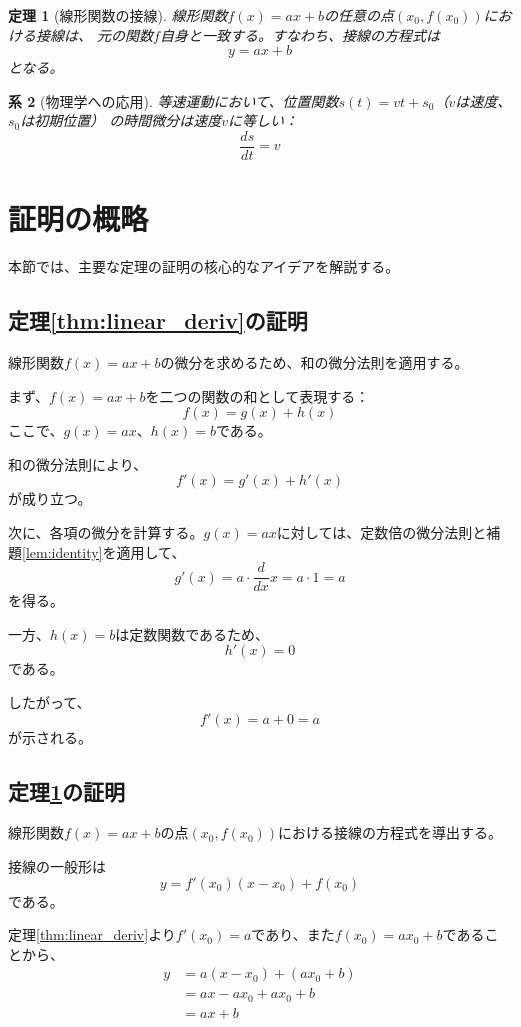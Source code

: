 \documentclass[a4paper,11pt]{jlreq}
\newtheorem{theorem}{定理}[section]
\newtheorem{corollary}[theorem]{系}
\begin{document}
\begin{theorem}[線形関数の接線]
\label{thm:tangent}
線形関数$f(x) = ax + b$の任意の点$(x_0, f(x_0))$における接線は、
元の関数$f$自身と一致する。すなわち、接線の方程式は
\[
y = ax + b
\]
となる。
\end{theorem}

\begin{corollary}[物理学への応用]
等速運動において、位置関数$s(t) = vt + s_0$（$v$は速度、$s_0$は初期位置）
の時間微分は速度$v$に等しい：
\[
\frac{ds}{dt} = v
\]
\end{corollary}

\section{証明の概略}

本節では、主要な定理の証明の核心的なアイデアを解説する。

\subsection{定理\ref{thm:linear_deriv}の証明}

線形関数$f(x) = ax + b$の微分を求めるため、和の微分法則を適用する。

まず、$f(x) = ax + b$を二つの関数の和として表現する：
\[
f(x) = g(x) + h(x)
\]
ここで、$g(x) = ax$、$h(x) = b$である。

和の微分法則により、
\[
f'(x) = g'(x) + h'(x)
\]
が成り立つ。

次に、各項の微分を計算する。$g(x) = ax$に対しては、定数倍の微分法則と補題\ref{lem:identity}を適用して、
\[
g'(x) = a \cdot \frac{d}{dx}x = a \cdot 1 = a
\]
を得る。

一方、$h(x) = b$は定数関数であるため、
\[
h'(x) = 0
\]
である。

したがって、
\[
f'(x) = a + 0 = a
\]
が示される。

\subsection{定理\ref{thm:tangent}の証明}

線形関数$f(x) = ax + b$の点$(x_0, f(x_0))$における接線の方程式を導出する。

接線の一般形は
\[
y = f'(x_0)(x - x_0) + f(x_0)
\]
である。

定理\ref{thm:linear_deriv}より$f'(x_0) = a$であり、また$f(x_0) = ax_0 + b$であることから、
\begin{align}
y &= a(x - x_0) + (ax_0 + b) \\
  &= ax - ax_0 + ax_0 + b \\
  &= ax + b
\end{align}
\end{document}
